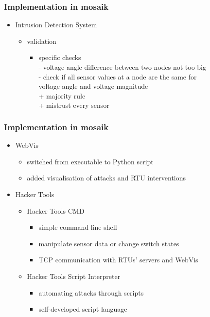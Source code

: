 \documentclass{beamer}
\begin{document}
\begin{frame}
	\frametitle{Implementation in mosaik}
	\begin{itemize}
		\item Intrusion Detection System
		\begin{itemize}
			\item validation
				\begin{itemize}
					\item specific checks \\
							\quad - voltage angle difference between two nodes not too big \\
							\quad - check if all sensor values at a node are the same for \\ \quad \space \space voltage angle and voltage magnitude \\
								\qquad + majority rule \\
								\qquad + mistrust every sensor
				\end{itemize}
		\end{itemize}
	\end{itemize}
\end{frame}

\begin{frame}
	\frametitle{Implementation in mosaik}
	\begin{itemize}
		\item WebVis
			\begin{itemize}
				\item switched from executable to Python script
				\item added visualisation of attacks and RTU interventions
			\end{itemize}
		\pause
		\item Hacker Tools
			\begin{itemize}
				\item Hacker Tools CMD
					\begin{itemize}
						\item simple command line shell
						\item manipulate sensor data or change switch states
						\item TCP communication with RTUs' servers and WebVis
					\end{itemize}
				\pause
				\item Hacker Tools Script Interpreter
					\begin{itemize}
						\item automating attacks through scripts
						\item self-developed script language
					\end{itemize}
			\end{itemize}
	\end{itemize}
\end{frame}
\end{document}
